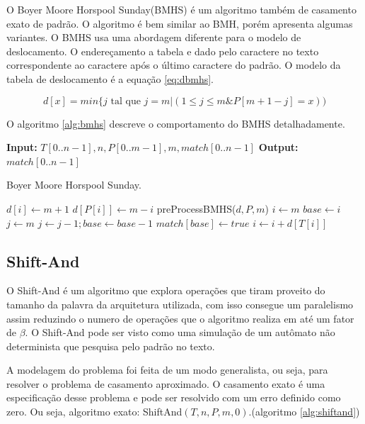 \documentclass[11pt]{article}
\begin{document}
O Boyer Moore Horspool Sunday(BMHS) é um algoritmo também de casamento exato de padrão. O algoritmo é bem similar ao BMH, porém apresenta algumas variantes. O BMHS usa uma abordagem diferente para o modelo de deslocamento. O endereçamento a tabela e dado pelo caractere no texto correspondente ao caractere após o último caractere do padrão. O modelo da tabela de deslocamento é a equação \ref{eq:dbmhs}.

\begin{equation}
d[x]=min\{ j \text{ tal que } j =m | (1 \leq j \leq m \& P[m+1-j]=x))
\label{eq:dbmhs}
\end{equation}

O algoritmo \ref{alg:bmhs} descreve o comportamento do BMHS detalhadamente.

\begin{algorithm}
\textbf{Input:} $T[0..n-1], n, P[0..m-1], m, match[0..n-1]$
\textbf{Output:} $match[0..n-1]$
\caption{Boyer Moore Horspool Sunday.}\label{alg:bmhs}
\begin{algorithmic}[1]
\State $d[i]\gets m+1$
\EndFor
{}
\State $d[P[i]]\gets m-i$
\EndFor
\EndProcedure
{}
\State preProcessBMHS($d,P,m$)
\State $i\gets m$
\State $base\gets i$
\State $j\gets m$
\State $j\gets j-1; base\gets base -1$
\EndWhile
{}
\State $match[base]\gets true$
\EndIf
{}
\State $i\gets i+d[T[i]]$
\Else
\State \Break
\EndIf
\EndWhile
\EndProcedure
\end{algorithmic}
\end{algorithm}

\subsection{Shift-And}
\label{sec:orgf15063b}

O Shift-And é um algoritmo que explora operações que tiram proveito do tamanho da palavra da arquitetura utilizada, com isso consegue um paralelismo assim reduzindo o numero de operações que o algoritmo realiza em até um fator de \(\beta\). O Shift-And pode ser visto como uma simulação de um autômato não determinista que pesquisa pelo padrão no texto.

A modelagem do problema foi feita de um modo generalista, ou seja, para resolver o problema de casamento aproximado. O casamento exato é uma especificação desse problema e pode ser resolvido com um erro definido como zero. Ou seja, algoritmo exato: ShiftAnd\((T,n,P,m,0)\).(algoritmo \ref{alg:shiftand})
\end{document}
